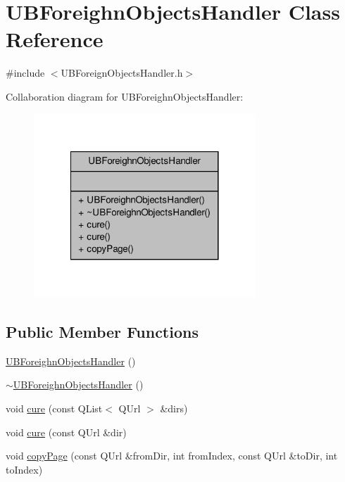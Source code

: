 \hypertarget{class_u_b_foreighn_objects_handler}{\section{U\-B\-Foreighn\-Objects\-Handler Class Reference}
\label{d5/d42/class_u_b_foreighn_objects_handler}
}


{\ttfamily \#include $<$U\-B\-Foreign\-Objects\-Handler.\-h$>$}



Collaboration diagram for U\-B\-Foreighn\-Objects\-Handler\-:
\nopagebreak
\begin{figure}[H]
\begin{center}
\leavevmode
\includegraphics[width=236pt]{db/d89/class_u_b_foreighn_objects_handler__coll__graph}
\end{center}
\end{figure}
\subsection*{Public Member Functions}
\begin{DoxyCompactItemize}
\item 
\hyperlink{class_u_b_foreighn_objects_handler_ac646ce58b4aa53887e609fb4b72d760a}{U\-B\-Foreighn\-Objects\-Handler} ()
\item 
\hyperlink{class_u_b_foreighn_objects_handler_a390759df6c944e2ce367f74995285b94}{$\sim$\-U\-B\-Foreighn\-Objects\-Handler} ()
\item 
void \hyperlink{class_u_b_foreighn_objects_handler_ab237668095daf967fe4b749a67a3f7dd}{cure} (const Q\-List$<$ Q\-Url $>$ \&dirs)
\item 
void \hyperlink{class_u_b_foreighn_objects_handler_a37ec4c04bad6f3a5c1259dc6b306f425}{cure} (const Q\-Url \&dir)
\item 
void \hyperlink{class_u_b_foreighn_objects_handler_a00c1daf6a51e30dcb2607f8b83005e25}{copy\-Page} (const Q\-Url \&from\-Dir, int from\-Index, const Q\-Url \&to\-Dir, int to\-Index)
\end{DoxyCompactItemize}
